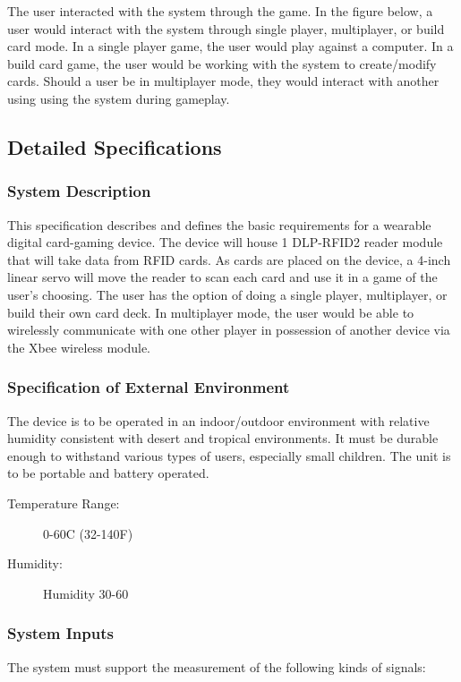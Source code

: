 \documentclass[12pt]{article} %
\begin{document}
The user interacted with the system through the game. In the figure below, a user would interact with the system through single player,
multiplayer, or build card mode. In a single player game, the user would play against a computer. In a build card game, the user would be working
with the system to create/modify cards. Should a user be in multiplayer mode, they would interact with another using using the system during gameplay.

\subsection{Detailed Specifications}\label{detailedSpec} %
\subsubsection{System Description}\label{designSystemSpec}

This specification describes and defines the basic requirements for a wearable digital card-gaming device. The device will house 1 DLP-RFID2 reader module that will take data from RFID cards. As cards are placed on the device, a 4-inch linear servo will move the reader to scan each card and use it in a game of the user’s choosing. The user has the option of doing a single player, multiplayer, or build their own card deck. In multiplayer mode, the user would be able to wirelessly communicate with one other player in possession of another device via the Xbee wireless module.

\subsubsection{Specification of External Environment}\label{designExtEnv}
The device is to be operated in an indoor/outdoor environment with relative humidity consistent with desert and tropical environments. It must be durable enough to withstand various types of users, especially small children.  The unit is to be portable and battery operated.

\begin{description}
	\item[Temperature Range:] 0-60C (32-140F)
	\item[Humidity:] Humidity 30-60%
\end{description}

\subsubsection{System Inputs}\label{inputs}
The system must support the measurement of the following kinds of signals:
\end{document}
